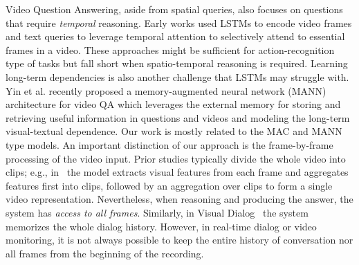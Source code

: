 Video Question Answering, aside from spatial queries, also focuses on questions that require \emph{temporal} reasoning. Early works \cite{mun2017marioqa, xu2017video, yu2017end} used LSTMs to encode video frames and text queries to leverage temporal attention to selectively attend to essential frames in a video. These approaches might be sufficient for action-recognition type of tasks but fall short when spatio-temporal reasoning is required. Learning long-term dependencies is also another challenge that LSTMs may struggle with. Yin et al. \cite{yin2019memory} recently proposed a memory-augmented neural network (MANN) architecture for video QA which leverages the external memory for storing and retrieving useful information in questions and videos and modeling the long-term visual-textual dependence.
Our work is mostly related to the MAC and MANN type models. An important distinction of our approach is the frame-by-frame processing of the video input. Prior studies typically divide the whole video into clips; e.g., in~\cite{song2018explore} the model extracts visual features from each frame and aggregates features first into clips, followed by an aggregation over clips to form a single video representation.
Nevertheless, when reasoning and producing the answer, the system has \emph{access to all frames}. Similarly, in Visual Dialog~\cite{das2017visual} the system memorizes the whole dialog history. However, in real-time dialog or video monitoring, it is not always possible to keep the entire history of conversation nor all frames from the beginning of the recording.